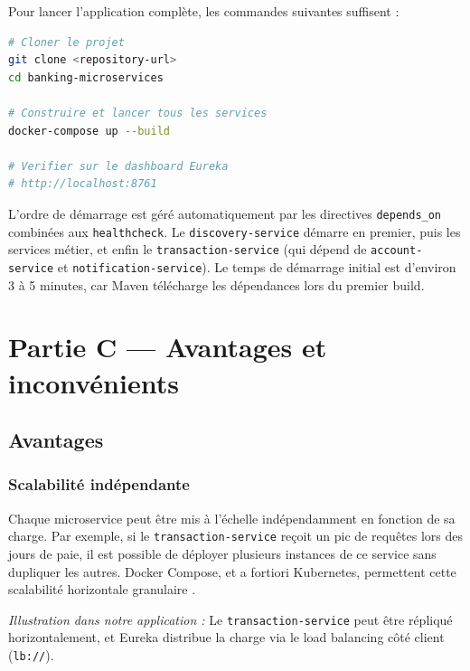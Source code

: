 \documentclass[12pt,a4paper]{article}
\begin{document}
Pour lancer l'application complète, les commandes suivantes suffisent :

\begin{lstlisting}[language=bash, basicstyle=\ttfamily\small, frame=single]
# Cloner le projet
git clone <repository-url>
cd banking-microservices

# Construire et lancer tous les services
docker-compose up --build

# Verifier sur le dashboard Eureka
# http://localhost:8761
\end{lstlisting}

L'ordre de démarrage est géré automatiquement par les directives \texttt{depends\_on} combinées aux \texttt{healthcheck}. Le \texttt{discovery-service} démarre en premier, puis les services métier, et enfin le \texttt{transaction-service} (qui dépend de \texttt{account-service} et \texttt{notification-service}). Le temps de démarrage initial est d'environ 3 à 5 minutes, car Maven télécharge les dépendances lors du premier build.


\section{Partie C --- Avantages et inconvénients}
\label{sec:partieC}

\subsection{Avantages}

\subsubsection{Scalabilité indépendante}

Chaque microservice peut être mis à l'échelle indépendamment en fonction de sa charge. Par exemple, si le \texttt{transaction-service} reçoit un pic de requêtes lors des jours de paie, il est possible de déployer plusieurs instances de ce service sans dupliquer les autres. Docker Compose, et a fortiori Kubernetes, permettent cette scalabilité horizontale granulaire \cite{newman2021}.

\textit{Illustration dans notre application :} Le \texttt{transaction-service} peut être répliqué horizontalement, et Eureka distribue la charge via le load balancing côté client (\texttt{lb://}).
\end{document}
